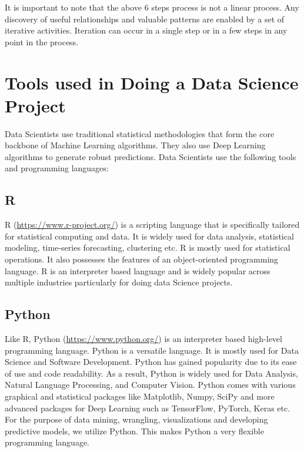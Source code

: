 \documentclass[
]{book}
\begin{document}
It is important to note that the above 6 steps process is not a linear process. Any discovery of useful relationships and valuable patterns are enabled by a set of iterative activities. Iteration can occur in a single step or in a few steps in any point in the process.

\hypertarget{tools-used-in-doing-a-data-science-project}{%
\section{Tools used in Doing a Data Science Project}\label{tools-used-in-doing-a-data-science-project}}

Data Scientists use traditional statistical methodologies that form the core backbone of Machine Learning algorithms. They also use Deep Learning algorithms to generate robust predictions. Data Scientists use the following tools and programming languages:

\hypertarget{r}{%
\subsection*{R}\label{r}}


R (\url{https://www.r-project.org/}) is a scripting language that is specifically tailored for statistical computing and data. It is widely used for data analysis, statistical modeling, time-series forecasting, clustering etc. R is mostly used for statistical operations. It also possesses the features of an object-oriented programming language. R is an interpreter based language and is widely popular across multiple industries particularly for doing data Science projects.

\hypertarget{python}{%
\subsection*{Python}\label{python}}


Like R, Python (\url{https://www.python.org/}) is an interpreter based high-level programming language. Python is a versatile language. It is mostly used for Data Science and Software Development. Python has gained popularity due to its ease of use and code readability. As a result, Python is widely used for Data Analysis, Natural Language Processing, and Computer Vision. Python comes with various graphical and statistical packages like Matplotlib, Numpy, SciPy and more advanced packages for Deep Learning such as TensorFlow, PyTorch, Keras etc. For the purpose of data mining, wrangling, visualizations and developing predictive models, we utilize Python. This makes Python a very flexible programming language.
\end{document}
